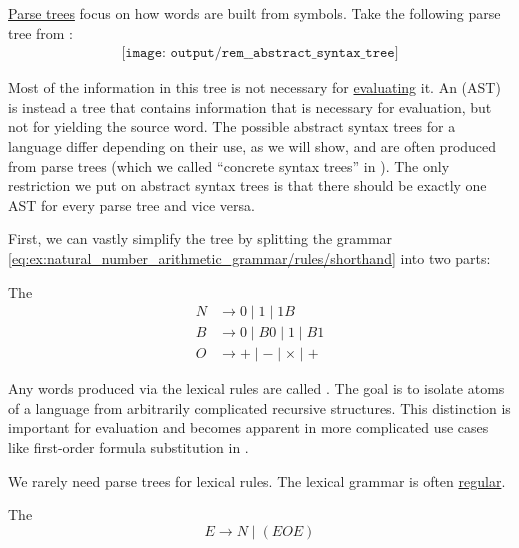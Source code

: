 \begin{remark}\label{rem:abstract_syntax_tree}
  \hyperref[def:parse_tree]{Parse trees} focus on how words are built from symbols. Take the following parse tree from :
  \begin{equation}\label{eq:rem:abstract_syntax_tree/base}
    \begin{aligned}
      \texttt{[image: output/rem\_\_abstract\_syntax\_tree]}
    \end{aligned}
  \end{equation}

  Most of the information in this tree is not necessary for \hyperref[rem:evaluation]{evaluating} it. An  (AST) is instead a tree that contains information that is necessary for evaluation, but not for yielding the source word. The possible abstract syntax trees for a language differ depending on their use, as we will show, and are often produced from parse trees (which we called \enquote{concrete syntax trees} in ). The only restriction we put on abstract syntax trees is that there should be exactly one AST for every parse tree and vice versa.

  First, we can vastly simplify the tree by splitting the grammar \eqref{eq:ex:natural_number_arithmetic_grammar/rules/shorthand} into two parts:
  \begin{thmenum}
     The 
    \begin{equation*}
      \begin{aligned}
        N &\to 0 \mid 1 \mid 1 B \\
        B &\to 0 \mid B 0 \mid 1 \mid B 1 \\
        O &\to + \mid - \mid \times \mid +
      \end{aligned}
    \end{equation*}

    Any words produced via the lexical rules are called . The goal is to isolate atoms of a language from arbitrarily complicated recursive structures. This distinction is important for evaluation and becomes apparent in more complicated use cases like first-order formula substitution in .

    We rarely need parse trees for lexical rules. The lexical grammar is often \hyperref[def:chomsky_hierarchy/regular]{regular}.

     The 
    \begin{equation*}
      E \to N \mid (E O E)
    \end{equation*}


\end{thmenum}
\end{remark}
